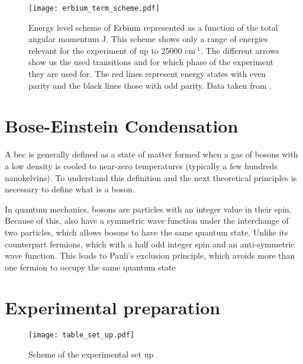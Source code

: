 \begin{figure}[h!]\centering
	\texttt{[image: erbium\_term\_scheme.pdf]}
	\caption[Erbium energy scheme]{Energy level scheme of Erbium represented as a function of the total angular momentum J. This scheme shows only a range of energies relevant for the experiment of up to 25000 $\text{cm}^{\text{-1}}$. The different arrows show us the used transitions and for which phase of the experiment they are used for. The red lines represent energy states with even parity and the black lines those with odd parity. Data taken from \cite{NIST}. }\label{fig:erbium_scheme}
\end{figure}


\section{Bose-Einstein Condensation} \label{sec:bose-einstein_condensation}

A \acl*{bec} is generally defined as a state of matter formed when a gas of bosons with a low density is cooled to near-zero temperatures (typically a few hundreds nanokelvins). To understand this definition and the next theoretical principles is necessary to define what is a boson. 

In quantum mechanics, bosons are particles with an integer value in their spin. Because of this,  also have a symmetric wave function under the interchange of two particles, which allows bosons to have the same quantum state. Unlike its counterpart fermions, which with a half odd integer spin and an anti-symmetric wave function. This leads to Pauli's exclusion principle, which avoids more than one fermion to occupy the same quantum state %




\hfill

\clearpage

\section{Experimental preparation} \label{sec:experimental_preparation}

\begin{figure}[h!]\centering
	\texttt{[image: table\_set\_up.pdf]}
	\caption[Scheme of the experimental set up]{Scheme of the experimental set up}\label{fig:table_set_up}
\end{figure}


